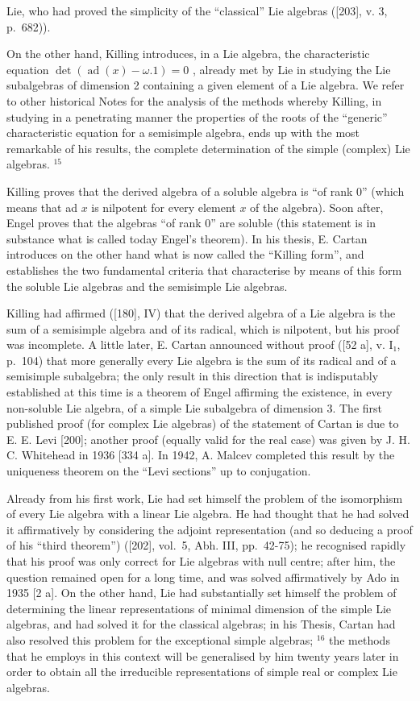 Lie, who had proved the simplicity of the ``classical'' Lie algebras ({[}203{]}, v. 3, p.~682)).

On the other hand, Killing introduces, in a Lie algebra, the characteristic equation \(\det(\operatorname{ad}(x)-\omega.1)=0\) , already met by Lie in studying the Lie subalgebras of dimension 2 containing a given element of a Lie algebra. We refer to other historical Notes for the analysis of the methods whereby Killing, in studying in a penetrating manner the properties of the roots of the ``generic'' characteristic equation for a semisimple algebra, ends up with the most remarkable of his results, the complete determination of the simple (complex) Lie algebras. \(^{15}\)

Killing proves that the derived algebra of a soluble algebra is ``of rank 0'' (which means that ad \(x\) is nilpotent for every element \(x\) of the algebra). Soon after, Engel proves that the algebras ``of rank 0'' are soluble (this statement is in substance what is called today Engel's theorem). In his thesis, E. Cartan introduces on the other hand what is now called the ``Killing form'', and establishes the two fundamental criteria that characterise by means of this form the soluble Lie algebras and the semisimple Lie algebras.

Killing had affirmed ({[}180{]}, IV) that the derived algebra of a Lie algebra is the sum of a semisimple algebra and of its radical, which is nilpotent, but his proof was incomplete. A little later, E. Cartan announced without proof ({[}52 a{]}, v. I₁, p.~104) that more generally every Lie algebra is the sum of its radical and of a semisimple subalgebra; the only result in this direction that is indisputably established at this time is a theorem of Engel affirming the existence, in every non-soluble Lie algebra, of a simple Lie subalgebra of dimension 3. The first published proof (for complex Lie algebras) of the statement of Cartan is due to E. E. Levi {[}200{]}; another proof (equally valid for the real case) was given by J. H. C. Whitehead in 1936 {[}334 a{]}. In 1942, A. Malcev completed this result by the uniqueness theorem on the ``Levi sections'' up to conjugation.

Already from his first work, Lie had set himself the problem of the isomorphism of every Lie algebra with a linear Lie algebra. He had thought that he had solved it affirmatively by considering the adjoint representation (and so deducing a proof of his ``third theorem'') ({[}202{]}, vol.~5, Abh. III, pp.~42-75); he recognised rapidly that his proof was only correct for Lie algebras with null centre; after him, the question remained open for a long time, and was solved affirmatively by Ado in 1935 {[}2 a{]}. On the other hand, Lie had substantially set himself the problem of determining the linear representations of minimal dimension of the simple Lie algebras, and had solved it for the classical algebras; in his Thesis, Cartan had also resolved this problem for the exceptional simple algebras; \(^{16}\) the methods that he employs in this context will be generalised by him twenty years later in order to obtain all the irreducible representations of simple real or complex Lie algebras.

